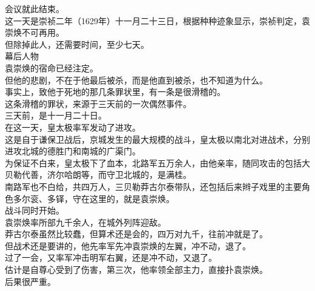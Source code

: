 \begin{multicols}{\theparacolNo}
会议就此结束。\\

这一天是崇祯二年（1629年）十一月二十三日，根据种种迹象显示，崇祯判定，袁崇焕不可再用。\\

但除掉此人，还需要时间，至少七天。\\

幕后人物\\

袁崇焕的宿命已经注定。\\

但他的悲剧，不在于他最后被杀，而是他直到被杀，也不知道为什么。\\

事实上，致他于死地的那几条罪状里，有一条是很滑稽的。\\

这条滑稽的罪状，来源于三天前的一次偶然事件。\\

三天前，是十一月二十日。\\

在这一天，皇太极率军发动了进攻。\\

这是自于谦保卫战后，京城发生的最大规模的战斗，皇太极以南北对进战术，分别进攻北城的德胜门和南城的广渠门。\\

为保证不白来，皇太极下了血本，北路军五万余人，由他亲率，随同攻击的包括大贝勒代善，济尔哈朗等，而守卫北城的，是满桂。\\

南路军也不白给，共四万人，三贝勒莽古尔泰带队，还包括后来辫子戏里的主要角色多尔衮、多铎，守在这里的，就是袁崇焕。\\

战斗同时开始。\\

袁崇焕率所部九千余人，在城外列阵迎敌。\\

莽古尔泰虽然比较蠢，但算术还是会的，四万对九千，往前冲就是了。\\

但战术还是要讲的，他先率军先冲袁崇焕的左翼，冲不动，退了。\\

过了一会，又率军冲击明军右翼，还是冲不动，又退了。\\

估计是自尊心受到了伤害，第三次，他率领全部主力，直接扑袁崇焕。\\

后果很严重。\\


\end{multicols}
